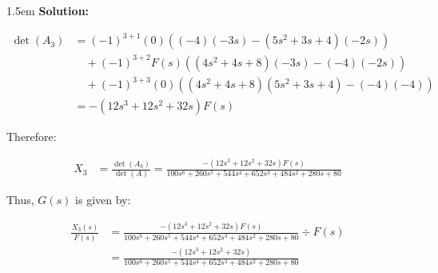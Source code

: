 \documentclass{article}
\newenvironment{solution}{
	\vspace{.5em}
	\par
	\begin{adjustwidth}{1.5em}{}
	\textbf{{Solution:}}
	\par
	\vspace{.5em}
}{
	\vspace{1em}
	\end{adjustwidth}
}
\begin{document}
\begin{solution}
	\begin{align*}
		\det(A_3) &= (-1)^{3+1}(0)\left( (-4)(-3s) - (5s^2 + 3s + 4)(-2s) \right) \\
			& \quad + (-1)^{3+2} F(s) \left( (4s^2 + 4s + 8)(-3s) - (-4)(-2s) \right) \\
			& \quad + (-1)^{3+3}(0) \left( (4s^2 + 4s + 8)(5s^2 + 3s + 4) - (-4)(-4) \right) \\
			&= -(12s^3 + 12s^2 + 32s) F(s)
	\end{align*}

	Therefore:

	\begin{align*}
		X_3 &= \frac{\det(A_3)}{\det(A)} = \frac{-(12s^3 + 12s^2 + 32s) F(s)}{100s^6 + 260s^5 + 544s^4 + 652s^3 + 484s^2 + 280s + 80}
	\end{align*}

	Thus, $G(s)$ is given by:

	\begin{align*}
		\frac{X_3(s)}{F(s)} &= \frac{-(12s^3 + 12s^2 + 32s) F(s)}{100s^6 + 260s^5 + 544s^4 + 652s^3 + 484s^2 + 280s + 80} \div F(s) \\
			&= \frac{-(12s^3 + 12s^2 + 32s)}{100s^6 + 260s^5 + 544s^4 + 652s^3 + 484s^2 + 280s + 80}
	\end{align*}
\end{solution}

\ifdefined\iscombined
	\newpage
\else
	
\end{document}
